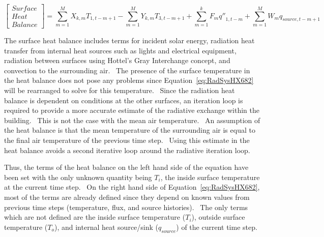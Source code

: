 {\begin{equation}
\left[ {\begin{array}{*{20}{c}}{Surface}\\ {Heat}\\ {Balance}\end{array}} \right] = \sum\limits_{m = 1}^M {{X_{k,m}}{T_{1,t - m + 1}}}  - \sum\limits_{m = 1}^M {{Y_{k,m}}{T_{3,t - m + 1}}}  + \sum\limits_{m = 1}^k {{F_m}{{q''}_{1,t - m}}}  + \sum\limits_{m = 1}^M {{W_m}{q_{source,t - m + 1}}}
\label{eq:RadSysHX682}
\end{equation}

The surface heat balance includes terms for incident solar energy, radiation heat transfer from internal heat sources such as lights and electrical equipment, radiation between surfaces using Hottel's Gray Interchange concept, and convection to the surrounding air.~ The presence of the surface temperature in the heat balance does not pose any problems since Equation~\ref{eq:RadSysHX682} will be rearranged to solve for this temperature.~ Since the radiation heat balance is dependent on conditions at the other surfaces, an iteration loop is required to provide a more accurate estimate of the radiative exchange within the building.~ This is not the case with the mean air temperature.~ An assumption of the heat balance is that the mean temperature of the surrounding air is equal to the final air temperature of the previous time step.~ Using this estimate in the heat balance avoids a second iterative loop around the radiative iteration loop.

Thus, the terms of the heat balance on the left hand side of the equation have been set with the only unknown quantity being \(T_i\), the inside surface temperature at the current time step.~ On the right hand side of Equation~\ref{eq:RadSysHX682}, most of the terms are already defined since they depend on known values from previous time steps (temperature, flux, and source histories).~ The only terms which are not defined are the inside surface temperature (\(T_i\)), outside surface temperature (\(T_o\)), and internal heat source/sink (\(q_{source}\)) of the current time step.

}
